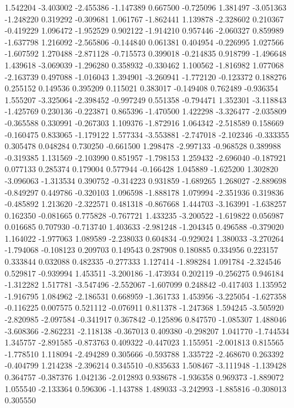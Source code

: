 1.542204
-3.403002
-2.455386
-1.147389
0.667500
-0.725096
1.381497
-3.051363
-1.248220
0.319292
-0.309681
1.061767
-1.862441
1.139878
-2.328602
0.210367
-0.419229
1.096472
-1.952529
0.902122
-1.914210
0.957446
-2.060327
0.859989
-1.637798
1.216092
-2.565806
-0.144840
0.061381
0.404954
-0.226995
1.027566
-1.607592
1.270488
-2.871128
-0.715573
0.399018
-0.214835
0.918799
-1.496648
1.439618
-3.069039
-1.296280
0.358932
-0.330462
1.100562
-1.816982
1.077068
-2.163739
0.497088
-1.016043
1.394901
-3.260941
-1.772120
-0.123372
0.188276
0.255152
0.149536
0.395209
0.115021
0.383017
-0.149408
0.762489
-0.936354
1.555207
-3.325064
-2.398452
-0.997249
0.551358
-0.794471
1.352301
-3.118843
-1.425769
0.230136
-0.223871
0.865396
-1.470500
1.422298
-3.326477
-2.035809
-0.365588
0.330991
-0.267303
1.109376
-1.872916
1.064342
-2.518589
0.158669
-0.160475
0.833065
-1.179122
1.577334
-3.553881
-2.747018
-2.102346
-0.333355
0.305478
0.048284
0.730250
-0.661500
1.298478
-2.997133
-0.968528
0.389988
-0.319385
1.131569
-2.103990
0.851957
-1.798153
1.259432
-2.696040
-0.187921
0.077133
0.285374
0.179004
0.577944
-0.166428
1.045889
-1.625200
1.302820
-3.096063
-1.313534
0.390752
-0.314223
0.931859
-1.689265
1.268027
-2.889698
-0.849297
0.449786
-0.320103
1.096598
-1.888178
1.079994
-2.351936
0.319836
-0.485892
1.213620
-2.322571
0.481318
-0.867668
1.444703
-3.163991
-1.638257
0.162350
-0.081665
0.775828
-0.767721
1.433235
-3.200522
-1.619822
0.056987
0.016685
0.707930
-0.713740
1.403633
-2.981248
-1.204345
0.496588
-0.379020
1.164022
-1.977063
1.089589
-2.238033
0.604834
-0.929024
1.380033
-3.270264
-1.794068
-0.108123
0.209703
0.149543
0.287908
0.180885
0.334956
0.223157
0.333844
0.032088
0.482335
-0.277333
1.127414
-1.898284
1.091784
-2.324546
0.529817
-0.939994
1.453511
-3.200186
-1.473934
0.202119
-0.256275
0.946184
-1.312282
1.517781
-3.547496
-2.552067
-1.607099
0.248842
-0.417403
1.135952
-1.916795
1.084962
-2.186531
0.668959
-1.361733
1.453956
-3.225054
-1.627358
-0.116225
0.007575
0.521112
-0.076911
0.811378
-1.247368
1.594245
-3.505920
-2.820985
-2.097584
-0.341917
0.367842
-0.125896
0.847570
-1.085307
1.488046
-3.608366
-2.862231
-2.118138
-0.367013
0.409380
-0.298207
1.041770
-1.744534
1.345757
-2.891585
-0.873763
0.409322
-0.447023
1.155951
-2.001813
0.815565
-1.778510
1.118094
-2.494289
0.305666
-0.593788
1.335722
-2.468670
0.263392
-0.404799
1.214238
-2.396214
0.345510
-0.835633
1.508467
-3.111948
-1.139428
0.364757
-0.387376
1.042136
-2.012893
0.938678
-1.936358
0.969373
-1.889072
1.055540
-2.133364
0.596306
-1.143788
1.489033
-3.242993
-1.885816
-0.308013
0.305550
